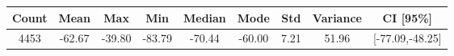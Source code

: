 \begin{tabular}{|c|c|c|c|c|c|c|c|c|}\hline
\rowcolor{Plum!20}
Count&Mean&Max&Min&Median&Mode&Std&Variance&CI [95\%]\\\hline\hline
4453&-62.67&-39.80&-83.79&-70.44&-60.00&7.21&51.96&[-77.09,-48.25]\\\hline
\end{tabular}
